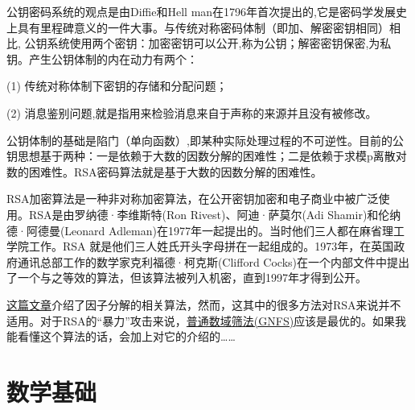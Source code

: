 \documentclass[a4paper]{article}  %
\begin{document}


公钥密码系统的观点是由Diffie和Hell man在1796年首次提出的,它是密码学发展史上具有里程碑意义的一件大事。与传统对称密码体制（即加、解密密钥相同）相比,
公钥系统使用两个密钥：加密密钥可以公开,称为公钥；解密密钥保密,为私钥。产生公钥体制的内在动力有两个：

(1) 传统对称体制下密钥的存储和分配问题；

(2) 消息鉴别问题,就是指用来检验消息来自于声称的来源并且没有被修改。

公钥体制的基础是陷门（单向函数）,即某种实际处理过程的不可逆性。目前的公钥思想基于两种：一是依赖于大数的因数分解的困难性；二是依赖于求模p离散对数的困难性。RSA密码算法就是基于大数的因数分解的困难性。

RSA加密算法是一种非对称加密算法，在公开密钥加密和电子商业中被广泛使用。RSA是由罗纳德·李维斯特(Ron Rivest)、阿迪·萨莫尔(Adi
Shamir)和伦纳德·阿德曼(Leonard Adleman)在1977年一起提出的。当时他们三人都在麻省理工学院工作。RSA
就是他们三人姓氏开头字母拼在一起组成的。1973年，在英国政府通讯总部工作的数学家克利福德·柯克斯(Clifford
Cocks)在一个内部文件中提出了一个与之等效的算法，但该算法被列入机密，直到1997年才得到公开。

\href{https://mathmu.github.io/MTCAS/doc/IntegerFactorization.html}{这篇文章}介绍了因子分解的相关算法，然而，这其中的很多方法对RSA来说并不适用。对于RSA的“暴力”攻击来说，\href{https://zh.wikipedia.org/wiki/%E6%99%AE%E9%80%9A%E6%95%B0%E5%9F%9F%E7%AD%9B%E9%80%89%E6%B3%95}{普通数域筛法(GNFS)}应该是最优的。如果我能看懂这个算法的话，会加上对它的介绍的…… %

\section[理论基础]{数学基础}
\end{document}
